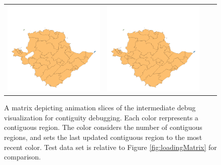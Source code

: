 \begin{figure}[p]
\begin{tabularx}{1\textwidth}{XXXX}
\includegraphics[width=1\linewidth]{images/ch6/contig/23}&
\includegraphics[width=1\linewidth]{images/ch6/contig/24} \\ %
\end{tabularx}
\caption{A matrix depicting animation slices of the intermediate debug visualization for contiguity debugging. Each color rerpresents a contiguous region. The color considers the number of contiguous regions, and sets the last updated contiguous region to the most recent color. Test data set is relative to Figure \ref{fig:loadingMatrix} for comparison.} \label{fig:contigMatrix}
\end{figure}

